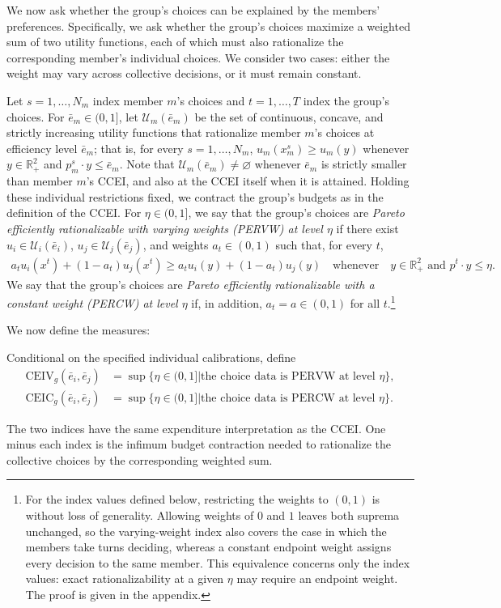 \documentclass[11 pt]{article}
\begin{document}
We now ask whether the group's choices can be explained by the members' preferences. Specifically, we ask whether the group's choices maximize a weighted sum of two utility functions, each of which must also rationalize the corresponding member's individual choices. We consider two cases: either the weight may vary across collective decisions, or it must remain constant.

Let $s=1,\ldots,N_m$ index member $m$'s choices and $t=1,\ldots,T$ index the group's choices. For $\bar e_m\in(0,1]$, let $\mathcal U_m(\bar e_m)$ be the set of continuous, concave, and strictly increasing utility functions that rationalize member $m$'s choices at efficiency level $\bar e_m$; that is, for every $s=1,\ldots,N_m$, $u_m(x_m^s)\geq u_m(y)$ whenever $y\in\mathbb R_+^2$ and $p_m^s\cdot y\leq\bar e_m$. Note that $\mathcal U_m(\bar e_m)\neq\varnothing$ whenever $\bar e_m$ is strictly smaller than member $m$'s CCEI, and also at the CCEI itself when it is attained. Holding these individual restrictions fixed, we contract the group's budgets as in the definition of the CCEI. For $\eta\in(0,1]$, we say that the group's choices are \emph{Pareto efficiently rationalizable with varying weights (PERVW) at level $\eta$} if there exist $u_i\in\mathcal U_i(\bar e_i)$, $u_j\in\mathcal U_j(\bar e_j)$, and weights $a_t\in(0,1)$ such that, for every $t$,
\begin{align}\label{eqn:collv2_fit}
a_t u_i(x^t)+(1-a_t)u_j(x^t)\geq a_t u_i(y)+(1-a_t)u_j(y)
\quad\text{whenever}\quad y\in\mathbb R_+^2 \text{ and } p^t\cdot y\leq\eta .
\end{align}
We say that the group's choices are \emph{Pareto efficiently rationalizable with a constant weight (PERCW) at level $\eta$} if, in addition, $a_t=a\in(0,1)$ for all $t$.\footnote{For the index values defined below, restricting the weights to $(0,1)$ is without loss of generality. Allowing weights of $0$ and $1$ leaves both suprema unchanged, so the varying-weight index also covers the case in which the members take turns deciding, whereas a constant endpoint weight assigns every decision to the same member. This equivalence concerns only the index values: exact rationalizability at a given $\eta$ may require an endpoint weight. The proof is given in the appendix.}

We now define the measures:
\begin{definition}\label{def:collv2_indices}\normalfont
Conditional on the specified individual calibrations, define
\begin{align}
\mathrm{CEIV}_g(\bar e_i,\bar e_j) &= \sup\{\eta\in(0,1] \vert \text{the choice data is PERVW at level $\eta$} \}, \nonumber \\
\mathrm{CEIC}_g(\bar e_i,\bar e_j) &= \sup\{\eta\in(0,1] \vert \text{the choice data is PERCW at level $\eta$} \}.
 \label{eqn:collv2_indices}
\end{align}
\end{definition}
The two indices have the same expenditure interpretation as the CCEI. One minus each index is the infimum budget contraction needed to rationalize the collective choices by the corresponding weighted sum. 
\end{document}
